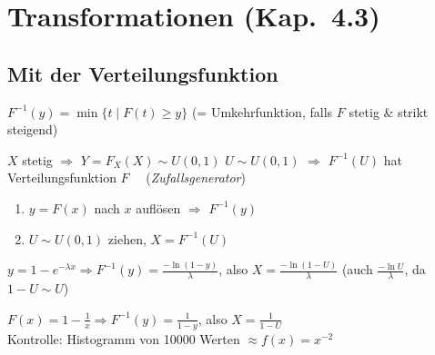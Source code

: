 \section{Transformationen (Kap.\ 4.3)}

\subsection{Mit der Verteilungsfunktion}
\begin{formel}
$F^{-1}(y)=\min\{t\mid F(t)\ge y\}$ \quad (= Umkehrfunktion, falls $F$ stetig \& strikt steigend)
\end{formel}
\begin{merke}[{{Satz 4.3.1}}]
\begin{itemize}
\pfeil $X$ stetig $\Rightarrow$ $Y=F_X(X)\sim U(0,1)$
\pfeil $U\sim U(0,1)$ $\Rightarrow$ $F^{-1}(U)$ hat Verteilungsfunktion $F$ \ \ (\emph{Zufallsgenerator})
\end{itemize}
\end{merke}
\begin{merke}
\begin{enumerate}[label=\arabic*.,leftmargin=*]
\item $y=F(x)$ nach $x$ auflösen $\Rightarrow$ $F^{-1}(y)$
\item $U\sim U(0,1)$ ziehen, $X=F^{-1}(U)$
\end{enumerate}
\end{merke}
\begin{bsp}[{{Exponential (4.3.2)}}]
$y=1-e^{-\lambda x}\Rightarrow F^{-1}(y)=\frac{-\ln(1-y)}{\lambda}$, also $X=\frac{-\ln(1-U)}\lambda$ (auch $\frac{-\ln U}{\lambda}$, da $1-U\sim U$)
\end{bsp}
\begin{bsp}[{{Potenzgesetz $p=2$ (4.3.3)}}]
$F(x)=1-\frac1x\Rightarrow F^{-1}(y)=\frac1{1-y}$, also $X=\frac1{1-U}$\\
Kontrolle: Histogramm von 10000 Werten $\approx f(x)=x^{-2}$
\end{bsp}


